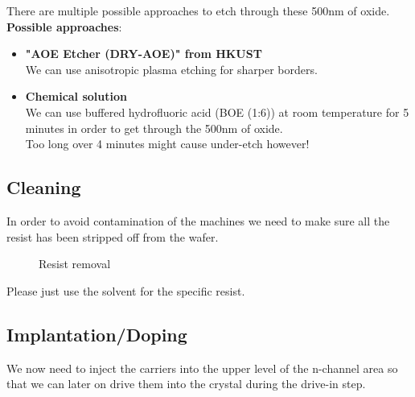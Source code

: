 There are multiple possible approaches to etch through these 500nm of oxide.\\

\textbf{Possible approaches}:
\begin{itemize}
	\item \textbf{"AOE Etcher (DRY-AOE)" from HKUST} \\
	We can use anisotropic plasma etching for sharper borders.
	\item \textbf{Chemical solution} \\
	We can use buffered hydrofluoric acid (BOE (1:6)) at room temperature for 5 minutes in order to get through the 500nm of oxide.\\
	Too long over 4 minutes might cause under-etch however!
\end{itemize}

\subsection{Cleaning}
In order to avoid contamination of the machines we need to make sure all the resist has been stripped off from the wafer.
\begin{figure}[H]
	\centering
	\begin{tikzpicture}[node distance = 3cm, auto, thick,scale=\CrossSectionOnly, every node/.style={transform shape}]
		
	\end{tikzpicture}
	\drawStepArrow{}
	\begin{tikzpicture}[node distance = 3cm, auto, thick,scale=\CrossSectionOnly, every node/.style={transform shape}]
		
	\end{tikzpicture}
	\caption{Resist removal}
\end{figure}
Please just use the solvent for the specific resist.

\newpage

\subsection{Implantation/Doping}\label{pwell_implant_step}
We now need to inject the carriers into the upper level of the n-channel area so that we can later on drive them into the crystal during the drive-in step.


